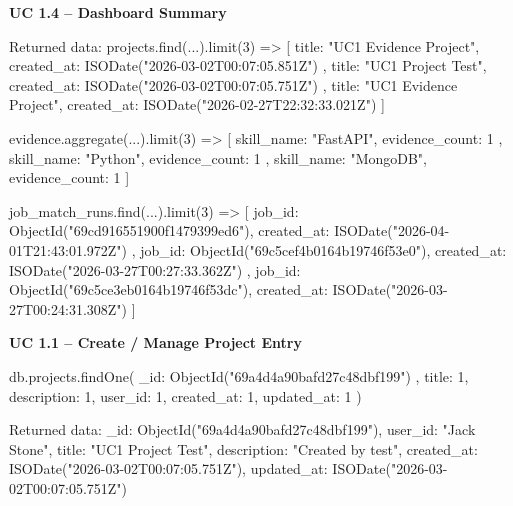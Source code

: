 \documentclass[11pt]{article}
\begin{document}
\noindent
\textbf{UC 1.4 -- Dashboard Summary}
\begin{TerminalBlock}
Returned data:
projects.find(...).limit(3) =>
[
  { title: "UC1 Evidence Project", created_at: ISODate("2026-03-02T00:07:05.851Z") },
  { title: "UC1 Project Test", created_at: ISODate("2026-03-02T00:07:05.751Z") },
  { title: "UC1 Evidence Project", created_at: ISODate("2026-02-27T22:32:33.021Z") }
]

evidence.aggregate(...).limit(3) =>
[
  { skill_name: "FastAPI", evidence_count: 1 },
  { skill_name: "Python", evidence_count: 1 },
  { skill_name: "MongoDB", evidence_count: 1 }
]

job_match_runs.find(...).limit(3) =>
[
  { job_id: ObjectId("69cd916551900f1479399ed6"), created_at: ISODate("2026-04-01T21:43:01.972Z") },
  { job_id: ObjectId("69c5cef4b0164b19746f53e0"), created_at: ISODate("2026-03-27T00:27:33.362Z") },
  { job_id: ObjectId("69c5ce3eb0164b19746f53dc"), created_at: ISODate("2026-03-27T00:24:31.308Z") }
]
\end{TerminalBlock}

\noindent
\textbf{UC 1.1 -- Create / Manage Project Entry}
\begin{TerminalBlock}
db.projects.findOne(
  { _id: ObjectId("69a4d4a90bafd27c48dbf199") },
  { title: 1, description: 1, user_id: 1, created_at: 1, updated_at: 1 }
)
\end{TerminalBlock}
\begin{TerminalBlock}
Returned data:
{
  _id: ObjectId("69a4d4a90bafd27c48dbf199"),
  user_id: "Jack Stone",
  title: "UC1 Project Test",
  description: "Created by test",
  created_at: ISODate("2026-03-02T00:07:05.751Z"),
  updated_at: ISODate("2026-03-02T00:07:05.751Z")
}
\end{TerminalBlock}
\end{document}
